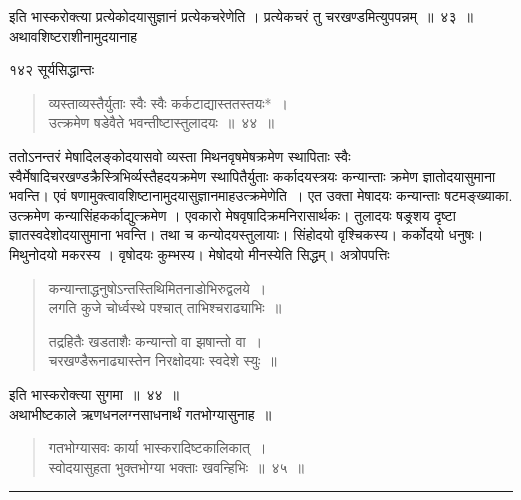 \documentclass[11pt, openany]{book}
\begin{document}
 \begin{sloppypar}
 इति भास्करोक्त्या प्रत्येकोदयासुज्ञानं प्रत्येकचरेणेति । प्रत्येकचरं तु चरखण्डमित्युपपन्नम्~॥~४३~॥\\
 अथावशिष्टराशीनामुदयानाह\textendash
\end{sloppypar}

\newpage

\noindent १४२ \hspace{3cm} सूर्यसिद्धान्तः
\vspace{1cm}

\begin{quote}
{\ssi व्यस्ताव्यस्तैर्युताः स्वैः स्वैः कर्कटाद्यास्ततस्तयः*~।\\
उत्क्रमेण षडेवैते भवन्तीष्टास्तुलादयः~॥~४४~॥}
\end{quote}

\begin{sloppypar}
ततोऽनन्तरं मेषादिलङ्कोदयासवो व्यस्ता मिथनवृषमेषक्रमेण स्थापिताः स्वैः स्वैर्मेषादिचरखण्डक्रैस्त्रिभिर्व्यस्तैहदयक्रमेण स्थापितैर्युताः कर्कादयस्त्रयः कन्यान्ताः क्रमेण ज्ञातोदयासुमाना भवन्ति। एवं षणामुक्त्वावशिष्टानामुदयासुज्ञानमाह\textendash उत्क्रमेणेति~। एत उक्ता मेषादयः कन्यान्ताः षटमङ्ख्याका. उत्क्रमेण कन्यासिंहकर्काद्युत्क्रमेण । एवकारो मेषवृषादिक्रमनिरासार्थकः। तुलादयः षङ्रशय दृष्टा ज्ञातस्वदेशोदयासुमाना भवन्ति। तथा च कन्योदयस्तुलायाः। सिंहोदयो वृश्चिकस्य। कर्कोदयो धनुषः। मिथुनोदयो मकरस्य । वृषोदयः कुम्भस्य। मेषोदयो मीनस्येति सिद्धम्। अत्रोपपत्तिः\textendash
\end{sloppypar}


\begin{quote}
{\qt कन्यान्ताद्धनुषोऽन्तस्तिथिमितनाडोभिरुद्वलये~।\\
लगति कुजे चोर्ध्वस्थे पश्चात् ताभिश्चराढ्याभिः~॥

तद्रहितैः खडताशैः कन्यान्तो वा झषान्तो वा~।\\
चरखण्डैरूनाढ्यास्तेन निरक्षोदयाः स्वदेशे स्युः~॥}
\end{quote}


\begin{sloppypar}
इति भास्करोक्त्या सुगमा~॥~४४~॥\\
\noindent अथाभीष्टकाले ऋणधनलग्नसाधनार्थं गतभोग्यासुनाह~॥ 
\end{sloppypar}


\begin{quote}
{\ssi गतभोग्यासवः कार्या भास्करादिष्टकालिकात्~।\\
स्वोदयासुहता भुक्तभोग्या भक्ताः खवन्हिभिः~॥~४५~॥}
\end{quote}
\noindent \rule{\linewidth}{.5pt}
\end{document}
